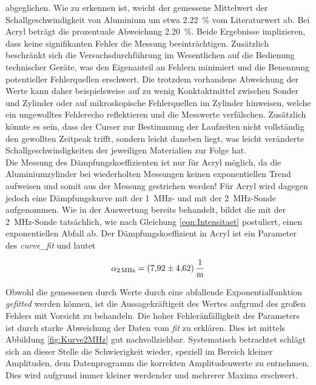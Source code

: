 \noindent abgeglichen. Wie zu erkennen ist, weicht der gemessene Mittelwert der Schallgeschwindigkeit von Aluminium um etwa \qty{2.22}{\percent}
vom Literaturwert ab. Bei Acryl beträgt die prozentuale Abweichung \qty{2.20}{\percent}. Beide Ergebnisse implizieren, dass 
keine signifikanten Fehler die Messung beeinträchtigen. Zusätzlich beschränkt sich die Versuchsdurchführung im Wesentlichen auf 
die Bedienung technischer Geräte, was den Eigenanteil an Fehlern minimiert und die Benennung potentieller Fehlerquellen
erschwert. Die trotzdem vorhandene Abweichung der Werte kann daher beispielsweise auf zu wenig Konktaktmittel zwischen Sonder 
und Zylinder oder auf mikroskopische Fehlerquellen im Zylinder hinweisen, welche ein ungewolltes Fehlerecho reflektieren 
und die Messwerte verfälschen. Zusätzlich könnte es sein, dass der Curser zur Bestimmung der Laufzeiten nicht vollständig den 
gewollten Zeitpeak trifft, sondern leicht daneben liegt, was leicht veränderte Schallgeschwindigkeiten der jeweiligen 
Materialien zur Folge hat.\\

\noindent Die Messung des Dämpfungskoeffizienten ist nur für Acryl möglich, da die Aluminiumzylinder bei wiederholten Messungen keinen 
exponentiellen Trend aufweisen und somit aus der Messung gestrichen werden! Für Acryl wird dagegen jedoch eine Dämpfungskurve 
mit der \qty{1}{\mega\hertz}- und mit der \qty{2}{\mega\hertz}-Sonde aufgenommen. Wie in der Auswertung bereits behandelt, bildet
die mit der \qty{2}{\mega\hertz}-Sonde tatsächlich, wie nach Gleichung \eqref{eqn:Intensitaet} postuliert, einen exponentiellen 
Abfall ab. Der Dämpfungskoeffizient in Acryl ist ein Parameter des \emph{curve\_fit} und lautet 

\begin{align*}
    \alpha_{\qty{2}{\mega\hertz}} = \qty{7.92\pm4.62}{\per\meter}
\end{align*}

\noindent Obwohl die gemessenen durch Werte durch eine abfallende Exponentialfunktion \emph{gefitted} werden können, ist die 
Aussagekräftigeit des Wertes aufgrund des großen Fehlers mit Vorsicht zu behandeln. Die hoher Fehleränfälligkeit des Parameters
ist durch starke Abweichung der Daten vom \emph{fit} zu erklären. Dies ist mittels Abbildung \ref{fig:Kurve2MHz} gut nachvollziehbar.
Systematisch betrachtet schlägt sich an dieser Stelle die Schwierigkeit wieder, speziell im Bereich kleiner Amplituden, dem 
Datenprogramm die korrekten Amplitudenwerte zu entnehmen. Dies wird aufgrund immer kleiner werdender und mehrerer Maxima erschwert.\\

